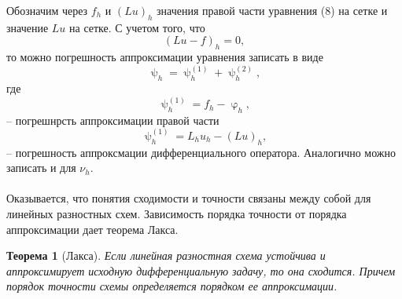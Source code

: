\documentclass[a4paper, 12pt]{report}
\numberwithin{equation}{section}
\renewcommand{\varphi}{\upvarphi}
\renewcommand{\psi}{\uppsi}
\newtheorem*{theorem}{Теорема}
\begin{document}
			Обозначим через $f_h$ и $(Lu)_h$ значения правой части уравнения (8) на сетке и значение $Lu$ на сетке. С учетом того, что 
			$$(Lu - f)_h = 0,$$
			то можно погрешность аппроксимации уравнения записать в виде
			$$\psi_h = \psi_h^{(1)} + \psi_h^{(2)},$$
			где
			$$\psi_h^{(1)} = f_h - \varphi_h,$$ -- погрешнрсть аппроксимации правой части
			$$\psi_h^{(1)} = L_h u_h - (Lu)_h,$$ -- погрешность аппроксмации дифференциального оператора. Аналогично можно записать и для $\nu_h$.\\\\
			Оказывается, что понятия сходимости и точности связаны между собой для линейных разностных схем. Зависимость порядка точности от порядка аппроксимации дает теорема Лакса.
			\begin{theorem}
				[Лакса] Если линейная разностная схема устойчива и аппроксимирует исходную дифференциальную задачу, то она сходится. Причем порядок точности схемы определяется порядком ее аппроксимации.
			\end{theorem}
\end{document}
